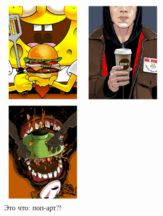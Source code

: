 \documentclass[12pt, a4paper]{article}
\begin{document}
\begin{figure}[h!]
\begin{minipage}[H]{0.3\linewidth}
\center  \includegraphics[height=5cm,width=4cm]{pop8.pdf}
\end{minipage}
\begin{minipage}[H]{0.3\linewidth} 
\center  \includegraphics[height=5cm,width=4cm]{pop5.pdf}
\end{minipage}
\begin{minipage}[H]{0.3\linewidth} 
\center  \includegraphics[height=5cm,width=4cm,angle = 180]{pop6.pdf}
\end{minipage}
\caption{Это что: поп-арт?!}
\end{figure}
\end{document}

